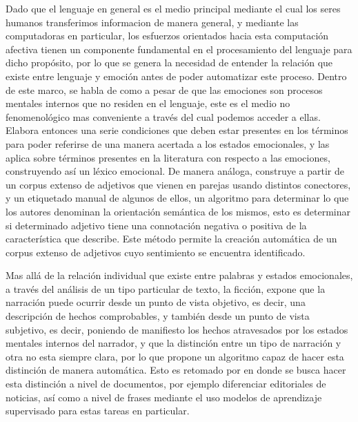Dado que el lenguaje en general es el medio principal mediante el cual los seres humanos transferimos informacion de manera general, y mediante las computadoras en particular, los esfuerzos orientados hacia esta computación afectiva tienen un componente fundamental en el procesamiento del lenguaje para dicho propósito, por lo que se genera la necesidad de entender la relación que existe entre lenguaje y emoción antes de poder automatizar este proceso. Dentro de este marco, \cite{ortony1987referential} se habla de como a pesar de que las emociones son procesos mentales internos que no residen en el lenguaje, este es el medio no fenomenológico mas conveniente a través del cual podemos acceder a ellas. Elabora entonces una serie condiciones que deben estar presentes en los términos para poder referirse de una manera acertada a los estados emocionales, y las aplica sobre términos presentes en la literatura con respecto a las emociones, construyendo así un léxico emocional. De manera análoga, \cite{hatzivassiloglou1997predicting} construye a partir de un corpus extenso de adjetivos que vienen en parejas usando distintos conectores, y un etiquetado manual de algunos de ellos, un algoritmo para determinar lo que los autores denominan la orientación semántica de los mismos, esto es determinar si determinado adjetivo tiene una connotación negativa o positiva de la característica que describe. Este método permite la creación automática de un corpus extenso de adjetivos cuyo sentimiento se encuentra identificado.

Mas allá de la relación individual que existe entre palabras y estados emocionales,  \cite{wiebe1994tracking} a través del análisis de un tipo particular de texto, la ficción, expone que la narración puede ocurrir desde un punto de vista objetivo, es decir, una descripción de hechos comprobables, y también desde un punto de vista subjetivo, es decir, poniendo de manifiesto los hechos atravesados por los estados mentales internos del narrador, y que la distinción entre un tipo de narración y otra no esta siempre clara, por lo que propone un algoritmo capaz de hacer esta distinción de manera automática. Esto es retomado por \cite{yu2003towards} en donde se busca hacer esta distinción a nivel de documentos, por ejemplo diferenciar editoriales  de noticias, así como a nivel de frases mediante el uso modelos de aprendizaje supervisado para estas tareas en particular.

